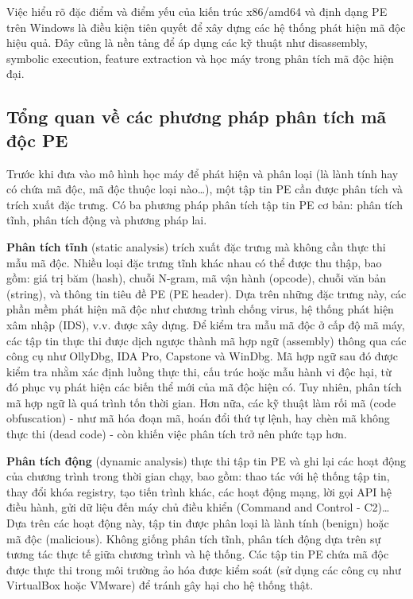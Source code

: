 Việc hiểu rõ đặc điểm và điểm yếu của kiến trúc x86/amd64 và định
dạng PE trên Windows là điều kiện tiên quyết để xây dựng các hệ thống
phát hiện mã độc hiệu quả. Đây cũng là nền tảng để áp dụng các kỹ
thuật như disassembly, symbolic execution, feature extraction và học
máy trong phân tích mã độc hiện đại.















\subsection{Tổng quan về các phương pháp phân tích mã độc PE}

Trước khi đưa vào mô hình học máy để phát hiện và phân loại (là lành
tính hay có chứa mã độc, mã độc thuộc loại nào\dots), một tập tin PE
cần được phân tích và trích xuất đặc trưng. Có ba phương pháp phân
tích tập tin PE cơ bản: phân tích tĩnh, phân tích động và phương pháp
lai. \cite{singh2021survey, damodaran2017comparison}

\textbf{Phân tích tĩnh} (static analysis) trích xuất đặc trưng mà
không cần thực thi mẫu mã độc. Nhiều loại đặc trưng tĩnh khác nhau
có thể được thu thập, bao gồm: giá trị băm (hash), chuỗi N-gram, mã
vận hành (opcode), chuỗi văn bản (string), và thông tin tiêu đề PE
(PE header). Dựa trên những đặc trưng này, các phần mềm phát hiện mã
độc như chương trình chống virus, hệ thống phát hiện xâm nhập (IDS),
v.v. được xây dựng. Để kiểm tra mẫu mã độc ở cấp độ mã máy, các tập
tin thực thi được dịch ngược thành mã hợp ngữ (assembly) thông qua
các công cụ như OllyDbg, IDA Pro, Capstone và WinDbg. Mã hợp ngữ sau
đó được kiểm tra nhằm xác định luồng thực thi, cấu trúc hoặc mẫu hành
vi độc hại, từ đó phục vụ phát hiện các biến thể mới của mã độc hiện
có. Tuy nhiên, phân tích mã hợp ngữ là quá trình tốn thời gian. Hơn
nữa, các kỹ thuật làm rối mã (code obfuscation) - như mã hóa đoạn
mã, hoán đổi thứ tự lệnh, hay chèn mã không thực thi (dead code) -
còn khiến việc phân tích trở nên phức tạp hơn.

\textbf{Phân tích động} (dynamic analysis) thực thi tập tin PE và ghi
lại các hoạt động của chương trình trong thời gian chạy, bao gồm: thao
tác với hệ thống tập tin, thay đổi khóa registry, tạo tiến trình khác,
các hoạt động mạng, lời gọi API hệ điều hành, gửi dữ liệu đến máy chủ
điều khiển (Command and Control - C2)\dots Dựa trên các hoạt động
này, tập tin được phân loại là lành tính (benign) hoặc mã độc
(malicious). Không giống phân tích tĩnh, phân tích động dựa trên sự
tương tác thực tế giữa chương trình và hệ thống. Các tập tin PE chứa
mã độc được thực thi trong môi trường ảo hóa được kiểm soát (sử dụng
các công cụ như VirtualBox hoặc VMware) để tránh gây hại cho hệ thống
thật.

